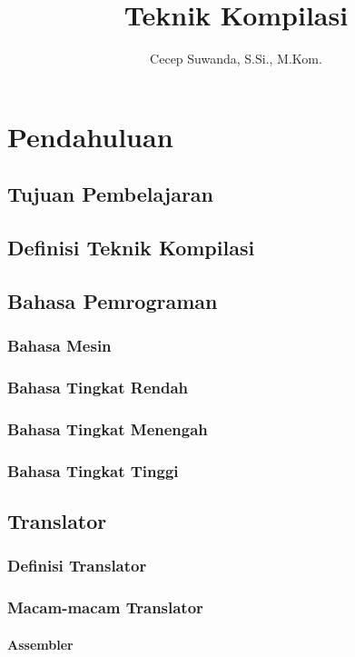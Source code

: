 \documentclass{book}
\title{Teknik Kompilasi}
\author{Cecep Suwanda, S.Si., M.Kom.}
\date{}
\begin{document}
\maketitle

\tableofcontents

\chapter{Pendahuluan}
    \section{Tujuan Pembelajaran} 
    \section{Definisi Teknik Kompilasi}
    \section{Bahasa Pemrograman}
         \subsection{Bahasa Mesin}
         \subsection{Bahasa Tingkat Rendah}
         \subsection{Bahasa Tingkat Menengah}
         \subsection{Bahasa Tingkat Tinggi}
    \section{Translator}
         \subsection{Definisi Translator}
         \subsection{Macam-macam Translator}
              \subsubsection{Assembler}
\end{document}
